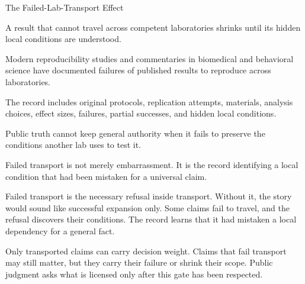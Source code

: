 \begin{phenom}{The Failed-Lab-Transport Effect~\cite{begley2012}}
\label{ph:failed-lab-transport}

\PhStatement
A result that cannot travel across competent laboratories shrinks until
its hidden local conditions are understood.

\PhOrigin
Modern reproducibility studies and commentaries in biomedical and behavioral
science have documented failures of published results to reproduce across
laboratories.

\PhObservation
The record includes original protocols, replication attempts, materials,
analysis choices, effect sizes, failures, partial successes, and hidden local
conditions.

\PhConstraint
Public truth cannot keep general authority when it fails to preserve the
conditions another lab uses to test it.

\PhConsequence
Failed transport is not merely embarrassment. It is the record identifying a
local condition that had been mistaken for a universal claim.
\end{phenom}

Failed transport is the necessary refusal inside transport. Without it,
the story would sound like successful expansion only. Some claims fail
to travel, and the refusal discovers their conditions. The record learns
that it had mistaken a local dependency for a general fact.

Only transported claims can carry decision weight. Claims that fail
transport may still matter, but they carry their failure or shrink their
scope. Public judgment asks what is licensed only after this gate has
been respected.

